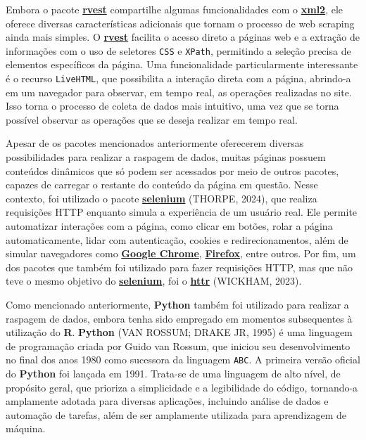 \documentclass[
  12pt,
  a4paper,
]{scrreprt}
\begin{document}
\vspace{12pt}

Embora o pacote \href{https://rvest.tidyverse.org/}{\textbf{rvest}}
compartilhe algumas funcionalidades com o
\href{https://xml2.r-lib.org/}{\textbf{xml2}}, ele oferece diversas
características adicionais que tornam o processo de web scraping ainda
mais simples. O \href{https://rvest.tidyverse.org/}{\textbf{rvest}}
facilita o acesso direto a páginas web e a extração de informações com o
uso de seletores \texttt{CSS} e \texttt{XPath}, permitindo a seleção
precisa de elementos específicos da página. Uma funcionalidade
particularmente interessante é o recurso \texttt{LiveHTML}, que
possibilita a interação direta com a página, abrindo-a em um navegador
para observar, em tempo real, as operações realizadas no site. Isso
torna o processo de coleta de dados mais intuitivo, uma vez que se torna
possível observar as operações que se deseja realizar em tempo real.

\vspace{12pt}

Apesar de os pacotes mencionados anteriormente oferecerem diversas
possibilidades para realizar a raspagem de dados, muitas páginas possuem
conteúdos dinâmicos que só podem ser acessados por meio de outros
pacotes, capazes de carregar o restante do conteúdo da página em
questão. Nesse contexto, foi utilizado o pacote
\href{https://cran.r-project.org/web/packages/selenium/index.html}{\textbf{selenium}}
(THORPE, 2024), que realiza requisições HTTP enquanto simula a
experiência de um usuário real. Ele permite automatizar interações com a
página, como clicar em botões, rolar a página automaticamente, lidar com
autenticação, cookies e redirecionamentos, além de simular navegadores
como
\href{https://www.google.com/chrome/dr/download/?brand=FHFK&ds_kid=43700077650614081&gclsrc=aw.ds&gad_source=1&gclid=Cj0KCQjwqv2_BhC0ARIsAFb5Ac8iSe-rhSTchZ2msE2z-JoowXEWygO93PuoGW7iiQS2AUY3cRexf14aAueTEALw_wcB}{\textbf{Google
Chrome}},
\href{https://www.mozilla.org/pt-BR/firefox/}{\textbf{Firefox}}, entre
outros. Por fim, um dos pacotes que também foi utilizado para fazer
requisições HTTP, mas que não teve o mesmo objetivo do
\href{https://cran.r-project.org/web/packages/selenium/index.html}{\textbf{selenium}},
foi o \href{https://httr.r-lib.org/}{\textbf{httr}} (WICKHAM, 2023).

\vspace{12pt}

Como mencionado anteriormente, \textbf{Python} também foi utilizado para
realizar a raspagem de dados, embora tenha sido empregado em momentos
subsequentes à utilização do \textbf{R}. \textbf{Python} (VAN ROSSUM;
DRAKE JR, 1995) é uma linguagem de programação criada por Guido van
Rossum, que iniciou seu desenvolvimento no final dos anos 1980 como
sucessora da linguagem \texttt{ABC}. A primeira versão oficial do
\textbf{Python} foi lançada em 1991. Trata-se de uma linguagem de alto
nível, de propósito geral, que prioriza a simplicidade e a legibilidade
do código, tornando-a amplamente adotada para diversas aplicações,
incluindo análise de dados e automação de tarefas, além de ser
amplamente utilizada para aprendizagem de máquina.
\end{document}
